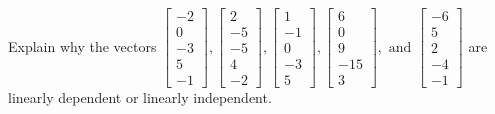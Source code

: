 \documentclass{article}
\begin{document}
\begin{exerciseStatement}
    Explain why the vectors \(\left[\begin{array}{r}
-2 \\
0 \\
-3 \\
5 \\
-1
\end{array}\right] , \left[\begin{array}{r}
2 \\
-5 \\
-5 \\
4 \\
-2
\end{array}\right] , \left[\begin{array}{r}
1 \\
-1 \\
0 \\
-3 \\
5
\end{array}\right] , \left[\begin{array}{r}
6 \\
0 \\
9 \\
-15 \\
3
\end{array}\right] , \text{ and } \left[\begin{array}{r}
-6 \\
5 \\
2 \\
-4 \\
-1
\end{array}\right]\) are linearly dependent or linearly independent.


  
\end{exerciseStatement}
\end{document}

